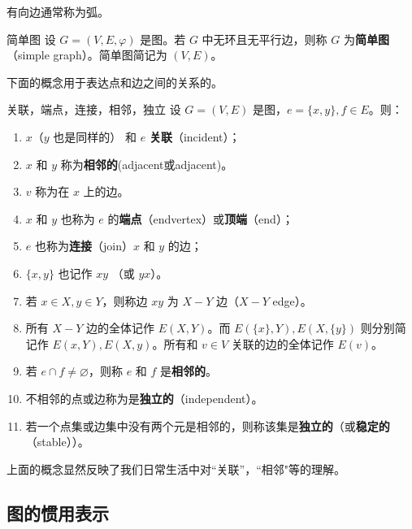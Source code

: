 有向边通常称为弧。

\begin{definition}{简单图}
设 $G=(V,E,\varphi)$ 是图。若 $G$ 中无环且无平行边，则称 $G$ 为\textbf{简单图}（simple graph）。简单图简记为 $(V,E)$。
\end{definition}

下面的概念用于表达点和边之间的关系的。
\begin{definition}{关联，端点，连接，相邻，独立}
设 $G=(V,E)$ 是图，$e=\{x,y\},f\in E$。则：

 \begin{enumerate}
 \item $x$（$y$ 也是同样的） 和 $e$ \textbf{关联}（incident）；

   \item  $x$ 和 $y$ 称为\textbf{相邻的}(adjacent或adjacent)。

   \item $v$ 称为在 $x$ 上的边。
  
   \item $x$ 和 $y$ 也称为 $e$ 的\textbf{端点}（endvertex）或\textbf{顶端}（end）；
  
  \item  $e$ 也称为\textbf{连接}（join）$x$ 和 $y$ 的边；

  \item  $\{x,y\}$ 也记作 $xy$ （或 $yx$）。
  
   \item 若 $x\in X,y\in Y$，则称边 $xy$ 为 $X-Y$ 边（$X-Y$ edge）。
  
   \item 所有 $X-Y$ 边的全体记作 $E(X,Y)$。而 $E(\{x\},Y),E(X,\{y\})$ 则分别简记作 $E(x,Y),E(X,y)$。所有和 $v\in V$ 关联的边的全体记作 $E(v)$。

   \item 若 $e\cap f\neq\varnothing$，则称 $e$ 和 $f$ 是\textbf{相邻的}。

   \item 不相邻的点或边称为是\textbf{独立的}（independent）。
   
   \item 若一个点集或边集中没有两个元是相邻的，则称该集是\textbf{独立的}（或\textbf{稳定的}（stable））。
 \end{enumerate}
\end{definition}
上面的概念显然反映了我们日常生活中对“关联”，“相邻"等的理解。

\subsection{图的惯用表示}

